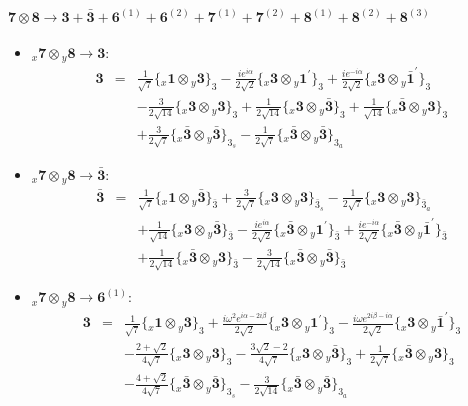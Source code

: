 \documentclass[english]{article}
\newcommand{\rep}[1]{\mathbf{#1}}
\newcommand{\repx}[2]{{}_{#2}\mathbf{#1}}
\newcommand{\subcg}[3]{\big\{ \repx{#1}{x}\otimes\repx{#2}{y}\big\}^{}_{#3}}
\begin{document}
\paragraph*{\Large $\rep{7}\otimes\rep{8}\to\rep{3}+\rep{\bar{3}}+\rep{6}^{(1)}+\rep{6}^{(2)}+\rep{7}^{(1)}+\rep{7}^{(2)}+\rep{8}^{(1)}+\rep{8}^{(2)}+\rep{8}^{(3)}$}
\begin{itemize}
\item $\repx{7}{x}\otimes\repx{8}{y}\to\rep{3}$:
\begin{eqnarray*}
\rep{3} &=& \frac{1}{\sqrt{7}}\subcg{1}{3}{3}-\frac{i e^{i \alpha }}{2 \sqrt{2}}\subcg{3}{1^{\prime}}{3}+\frac{i e^{-i \alpha }}{2 \sqrt{2}}\subcg{3}{\bar{1}^{\prime}}{3} \\ 
 & & -\frac{3}{2 \sqrt{14}}\subcg{3}{3}{3}+\frac{1}{2 \sqrt{14}}\subcg{3}{\bar{3}}{3}+\frac{1}{\sqrt{14}}\subcg{\bar{3}}{3}{3} \\ 
 & & +\frac{3}{2 \sqrt{7}}\subcg{\bar{3}}{\bar{3}}{3_{s}}-\frac{1}{2 \sqrt{7}}\subcg{\bar{3}}{\bar{3}}{3_{a}}
\end{eqnarray*}
\item $\repx{7}{x}\otimes\repx{8}{y}\to\rep{\bar{3}}$:
\begin{eqnarray*}
\rep{\bar{3}} &=& \frac{1}{\sqrt{7}}\subcg{1}{\bar{3}}{\bar{3}}+\frac{3}{2 \sqrt{7}}\subcg{3}{3}{\bar{3}_{s}}-\frac{1}{2 \sqrt{7}}\subcg{3}{3}{\bar{3}_{a}} \\ 
 & & +\frac{1}{\sqrt{14}}\subcg{3}{\bar{3}}{\bar{3}}-\frac{i e^{i \alpha }}{2 \sqrt{2}}\subcg{\bar{3}}{1^{\prime}}{\bar{3}}+\frac{i e^{-i \alpha }}{2 \sqrt{2}}\subcg{\bar{3}}{\bar{1}^{\prime}}{\bar{3}} \\ 
 & & +\frac{1}{2 \sqrt{14}}\subcg{\bar{3}}{3}{\bar{3}}-\frac{3}{2 \sqrt{14}}\subcg{\bar{3}}{\bar{3}}{\bar{3}}
\end{eqnarray*}
\item $\repx{7}{x}\otimes\repx{8}{y}\to\rep{6}^{(1)}$:
\begin{eqnarray*}
\rep{3} &=& \frac{1}{\sqrt{7}}\subcg{1}{3}{3}+\frac{i \omega ^2 e^{i \alpha -2 i \beta }}{2 \sqrt{2}}\subcg{3}{1^{\prime}}{3}-\frac{i \omega  e^{2 i \beta -i \alpha }}{2 \sqrt{2}}\subcg{3}{\bar{1}^{\prime}}{3} \\ 
 & & -\frac{2+\sqrt{2}}{4 \sqrt{7}}\subcg{3}{3}{3}-\frac{3 \sqrt{2}-2}{4 \sqrt{7}}\subcg{3}{\bar{3}}{3}+\frac{1}{2 \sqrt{7}}\subcg{\bar{3}}{3}{3} \\ 
 & & -\frac{4+\sqrt{2}}{4 \sqrt{7}}\subcg{\bar{3}}{\bar{3}}{3_{s}}-\frac{3}{2 \sqrt{14}}\subcg{\bar{3}}{\bar{3}}{3_{a}}
\\

\end{eqnarray*}
\end{itemize}
\end{document}

